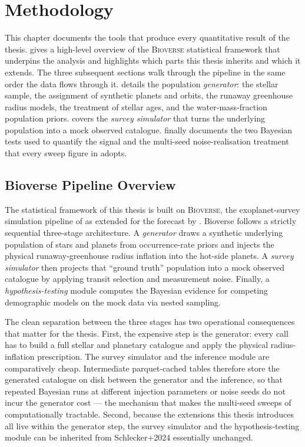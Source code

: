 \chapter{Methodology}
\label{chap:methodology}

This chapter documents the tools that produce every quantitative
result of the thesis.   gives a high-level
overview of the \textsc{Bioverse} statistical framework
\parencite{BixelApai2021,Schlecker2024} that underpins the analysis
and highlights which parts this thesis inherits and which it extends.
The three subsequent sections walk through the pipeline in the same
order the data flows through it.   details the
population \emph{generator}: the stellar sample, the assignment of
synthetic planets and orbits, the runaway greenhouse radius models,
the treatment of stellar ages, and the water-mass-fraction population
priors.   covers the \emph{survey
simulator} that turns the underlying population into a mock observed
catalogue.   finally documents the
two Bayesian tests used to quantify the \HZIED signal and the
multi-seed noise-realisation treatment that every sweep figure in
 adopts.


\section{Bioverse Pipeline Overview}
\label{sec:bioverse}

The statistical framework of this thesis is built on \textsc{Bioverse},
the exoplanet-survey simulation pipeline of \textcite{BixelApai2021}
as extended for the \HZIED forecast by \textcite{Schlecker2024}.
Bioverse follows a strictly sequential three-stage architecture.  A
\emph{generator} draws a synthetic underlying population of stars
and planets from occurrence-rate priors and injects the physical
runaway-greenhouse radius inflation into the hot-side planets.  A
\emph{survey simulator} then projects that ``ground truth''
population into a mock observed catalogue by applying transit
selection and measurement noise.  Finally, a \emph{hypothesis-testing}
module computes the Bayesian evidence for competing demographic
models on the mock data via nested sampling.

The clean separation between the three stages has two operational
consequences that matter for the thesis.  First, the expensive step
is the generator: every call has to build a full stellar and
planetary catalogue and apply the physical radius-inflation
prescription.  The survey simulator and the inference module are
comparatively cheap.  Intermediate parquet-cached tables therefore
store the generated catalogue on disk between the generator and the
inference, so that repeated Bayesian runs at different injection
parameters or noise seeds do not incur the generator cost --- the
mechanism that makes the multi-seed sweeps of 
computationally tractable.  Second, because the extensions this
thesis introduces all live within the generator step, the survey
simulator and the hypothesis-testing module can be inherited from
Schlecker+2024 essentially unchanged.

